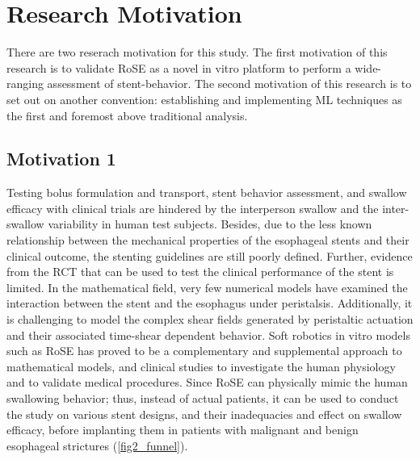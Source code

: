 \section{Research Motivation}

There are two reserach motivation for this study. The first motivation of
this research is to validate \ac{RoSE} as a novel in vitro platform to perform
a wide-ranging assessment of stent-behavior. The second motivation
of this research is to set out on another convention: establishing and
implementing \ac{ML} techniques as the first and foremost
above traditional analysis.

\subsection{Motivation 1}

Testing bolus formulation and transport, stent behavior assessment,
and swallow efficacy with clinical trials are hindered by the interperson
swallow and the inter-swallow variability in human test subjects.
Besides, due to the less known relationship between the mechanical
properties of the esophageal stents and their clinical outcome, the
stenting guidelines are still poorly defined. Further, evidence from the
\ac{RCT} that can be used to test the clinical performance of the stent is
limited.
In the mathematical field, very few numerical models have examined
the interaction between the stent and the esophagus under peristalsis.
Additionally, it is challenging to model the complex shear fields generated
by peristaltic actuation and their associated time-shear dependent
behavior.
Soft robotics in vitro models such as \ac{RoSE} has proved to be a complementary
and supplemental approach to mathematical models, and
clinical studies to investigate the human physiology and to validate
medical procedures. Since \ac{RoSE} can physically mimic the human swallowing
behavior; thus, instead of actual patients, it can be used to
conduct the study on various stent designs, and their inadequacies
and effect on swallow efficacy, before implanting them in patients
with malignant and benign esophageal strictures (\autoref{fig2_funnel}).

